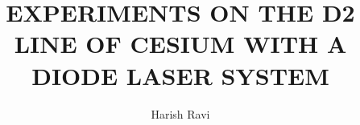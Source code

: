 
\pagestyle{bfheadings}






\begin{frontmatter}
%
%

\title{EXPERIMENTS ON THE D2 LINE OF CESIUM WITH A DIODE LASER SYSTEM}
\author{Harish Ravi}
\sciencefaculty


\end{frontmatter}

